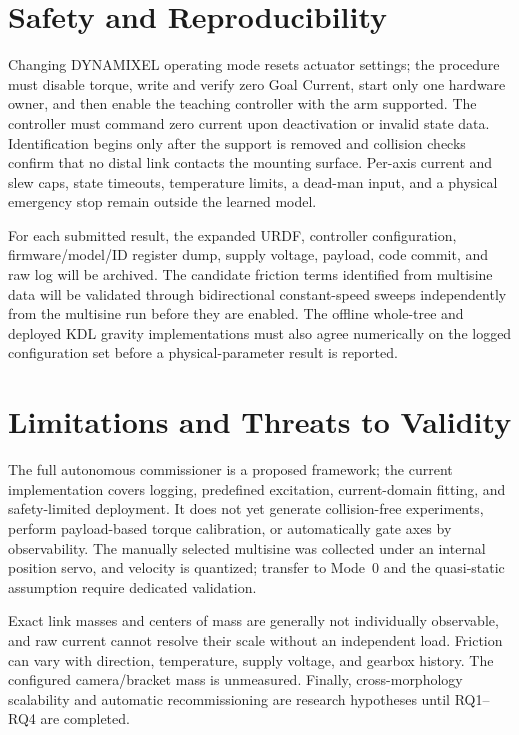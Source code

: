\documentclass[conference]{IEEEtran}
\begin{document}
\section{Safety and Reproducibility}
Changing DYNAMIXEL operating mode resets actuator settings; the procedure must
disable torque, write and verify zero Goal Current, start only one hardware
owner, and then enable the teaching controller with the arm supported. The
controller must command zero current upon deactivation or invalid state data.
Identification begins only after the support is removed and collision checks
confirm that no distal link contacts the mounting surface. Per-axis current and
slew caps, state timeouts, temperature limits, a dead-man input, and a physical
emergency stop remain outside the learned model.

For each submitted result, the expanded URDF, controller configuration,
firmware/model/ID register dump, supply voltage, payload, code commit, and raw
log will be archived. The candidate friction terms identified from multisine
data will be validated through bidirectional constant-speed sweeps independently
from the multisine run before they are enabled. The offline whole-tree and
deployed KDL gravity implementations must also agree numerically on the logged
configuration set before a physical-parameter result is reported.

\section{Limitations and Threats to Validity}
The full autonomous commissioner is a proposed framework; the current
implementation covers logging, predefined excitation, current-domain fitting,
and safety-limited deployment. It does not yet generate collision-free
experiments, perform payload-based torque calibration, or automatically gate
axes by observability. The manually selected multisine was collected under an
internal position servo, and velocity is quantized; transfer to Mode~0 and the
quasi-static assumption require dedicated validation.

Exact link masses and centers of mass are generally not individually
observable, and raw current cannot resolve their scale without an independent
load. Friction can vary with direction, temperature, supply voltage, and
gearbox history. The configured camera/bracket mass is unmeasured. Finally,
cross-morphology scalability and automatic recommissioning are research
hypotheses until RQ1--RQ4 are completed.
\end{document}
